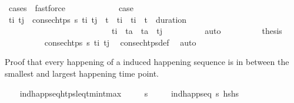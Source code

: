 \begin{isabellebody}
\ {\isacharparenleft}{\kern0pt}cases\ {\isasympi}{\isacharparenright}{\kern0pt}\ fastforce{\isacharplus}{\kern0pt}\isanewline
\ \ \ \ \isamarkupfalse%
\isanewline
\ \ \ \ \ \ \isamarkupfalse%
\ {\isacharquery}{\kern0pt}case{}\isanewline
\ \ \ \ \ \ \isamarkupfalse%
\ \isamarkupfalse%
\ t\isactrlsub i\ t\isactrlsub j\ \ {\isachardoublequoteopen}consec{\isacharunderscore}{\kern0pt}htps\ {\isasympi}s\ t\isactrlsub i\ t\isactrlsub j{\isachardoublequoteclose}\ \ {\isachardoublequoteopen}t\isactrlsub {\isasympi}\ {\isasymle}\ t\isactrlsub i\ {\isasymand}\ t\isactrlsub i\ {\isacharless}{\kern0pt}\ t\isactrlsub {\isasympi}\ {\isacharplus}{\kern0pt}\ {\isacharparenleft}{\kern0pt}duration\ {\isasympi}{\isacharparenright}{\kern0pt}{\isachardoublequoteclose}\ \isanewline
\ \ \ \ \ \ \ \ \ \ \ \ \ \ \ \ \ \ \ \ \ \ \ \ \ \ {\isachardoublequoteopen}t\isactrlsub i\ {\isacharless}{\kern0pt}\ t\isactrlsub a\ {\isasymand}\ t\isactrlsub a\ {\isacharless}{\kern0pt}\ t\isactrlsub j{\isachardoublequoteclose}\isanewline
\ \ \ \ \ \ \ \ \isamarkupfalse%
\ auto\isanewline
\ \ \ \ \ \ \isamarkupfalse%
\ \isamarkupfalse%
\ {\isacharquery}{\kern0pt}thesis\isanewline
\ \ \ \ \ \ \ \ \isamarkupfalse%
\ {\isacartoucheopen}consec{\isacharunderscore}{\kern0pt}htps\ {\isasympi}s\ t\isactrlsub i\ t\isactrlsub j{\isacartoucheclose}\ \isamarkupfalse%
\ consec{\isacharunderscore}{\kern0pt}htps{\isacharunderscore}{\kern0pt}def\ \isamarkupfalse%
\ auto\isanewline
\ \ \ \ \isamarkupfalse%
\isanewline
\ \ \isamarkupfalse%
%
\endisatagproof
{\isafoldproof}%
%
\isadelimproof
%
\endisadelimproof
%
\begin{isamarkuptext}%
Proof that every happening of a induced happening sequence is in between 
  the smallest and largest happening time point.%
\end{isamarkuptext}\isamarkuptrue%
\ \ \isamarkupfalse%
\ ind{\isacharunderscore}{\kern0pt}happ{\isacharunderscore}{\kern0pt}seq{\isacharunderscore}{\kern0pt}htps{\isacharunderscore}{\kern0pt}leq{\isacharunderscore}{\kern0pt}t\isactrlsub m\isactrlsub i\isactrlsub n{\isacharunderscore}{\kern0pt}t\isactrlsub m\isactrlsub a\isactrlsub x{\isacharcolon}{\kern0pt}\isanewline
\ \ \ \ \ {\isasympi}s\isanewline
\ \ \ \ \ {\isachardoublequoteopen}ind{\isacharunderscore}{\kern0pt}happ{\isacharunderscore}{\kern0pt}seq\ {\isasympi}s\ {\isacharparenleft}{\kern0pt}hs{\isacharprime}{\kern0pt}{\isacharat}{\kern0pt}hs{\isacharparenright}{\kern0pt}{\isachardoublequoteclose}\isanewline

\end{isabellebody}
